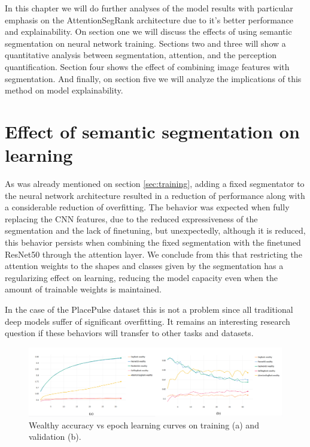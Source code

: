 In this chapter we will do further analyses of the model results with particular
emphasis on the AttentionSegRank architecture due to it's better performance
and explainability. On section one we will discuss the effects of using semantic segmentation
on neural network  training. Sections two and three will show a quantitative analysis between
segmentation, attention, and the perception quantification. Section four shows the effect of combining
image features with segmentation. And finally, on section five we will
analyze the implications of this method on model explainability.

\section{Effect of semantic segmentation on learning}
As was already mentioned on section \ref{sec:training}, adding a fixed segmentator to
the neural network architecture resulted in a reduction of performance along with a considerable
reduction of overfitting. The behavior was expected when fully replacing the CNN features,
due to the reduced expressiveness of the segmentation and the lack of finetuning, but
unexpectedly, although it is reduced, this behavior persists when combining the fixed
segmentation with the finetuned ResNet50 through the attention layer. We conclude from this
that restricting the attention weights to the shapes and classes given by the segmentation
has a regularizing effect on learning, reducing the model capacity even when the amount of trainable
weights is maintained.

In the case of the PlacePulse dataset this is not a problem since
all traditional deep models suffer of significant overfitting. It remains an interesting research
question  if these behaviors will transfer to other tasks and datasets.

\begin{figure}[ht]
	\begin{center}
	\includegraphics[width=1\textwidth]{./figures/wealthy_graph.png}
	\caption[Wealthy Training curves]{
        Wealthy accuracy vs epoch learning curves on training (a) and validation (b).
        }
	\label{fig:wealthy_graph}
	\end{center}
\end{figure}

